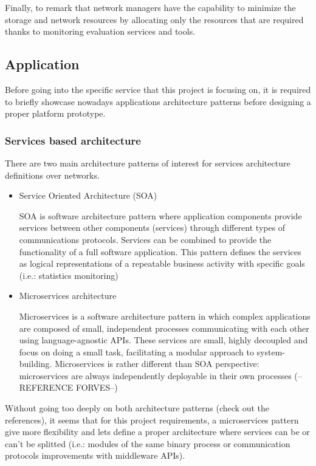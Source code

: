 Finally, to remark that network managers have the capability to minimize the storage and network resources by allocating only the resources that are required thanks to monitoring evaluation services and tools.

\subsection{Application}\label{SOA:coreService}

Before going into the specific service that this project is focusing on, it is required to briefly showcase nowadays applications architecture patterns before designing a proper platform prototype.

\subsubsection{Services based architecture}\label{SOA:appArch}

There are two main architecture patterns of interest for services architecture definitions over networks.

\begin{itemize}
\item Service Oriented Architecture (SOA) \hfill

SOA is software architecture pattern where application components provide services between other components (services) through different types of communications protocols. Services can be combined to provide the functionality of a full software application.
This pattern defines the services as logical representations of a repeatable business activity with specific goals (i.e.: statistics monitoring)

\item Microservices architecture \hfill

Microservices is a software architecture pattern in which complex applications are composed of small, independent processes communicating with each other using language-agnostic APIs. These services are small, highly decoupled and focus on doing a small task, facilitating a modular approach to system-building. 
Microservices is rather different than SOA perspective: microservices are always independently deployable in their own processes  (-- REFERENCE FORVES--)

\end{itemize}

Without going too deeply on both architecture patterns (check out the references), it seems that for this project requirements, a microservices pattern give more flexibility and lets define a proper architecture where services can be or can't be splitted (i.e.: modules of the same binary process or communication protocols improvements with middleware APIs).

